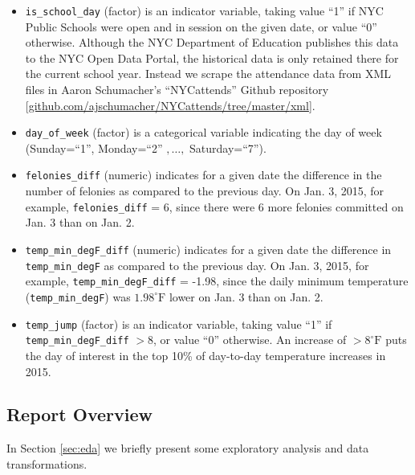 \documentclass[11pt,notitlepage]{article}
\newcommand{\degf}{^\circ\text{F}}
\begin{document}
\begin{itemize}
\item \texttt{is_school_day} (factor) is an indicator variable, taking value ``1'' if NYC Public Schools were open and in session on the given date, or value ``0'' otherwise. Although the NYC Department of Education publishes this data to the NYC Open Data Portal, the historical data is only retained there for the current school year. Instead we scrape the attendance data from XML files in Aaron Schumacher's ``NYCattends'' Github repository [\href{https://github.com/ajschumacher/NYCattends/tree/master/xml}{github.com/ajschumacher/NYCattends/tree/master/xml}].


\item \texttt{day_of_week} (factor) is a categorical variable indicating the day of week (Sunday=``1'', Monday=``2'' $, \ldots, $ Saturday=``7''). 

\item \texttt{felonies_diff} (numeric) indicates for a given date the difference in the number of felonies as compared to the previous day. On Jan. 3, 2015, for example, \texttt{felonies_diff} = 6, since there were 6 more felonies committed on Jan. 3 than on Jan. 2.

\item \texttt{temp_min_degF_diff} (numeric) indicates for a given date the difference in \texttt{temp_min_degF} as compared to the previous day. On Jan. 3, 2015, for example, \texttt{temp_min_degF_diff} = -1.98, since the daily minimum temperature (\texttt{temp_min_degF}) was $1.98 \degf$ lower on Jan. 3 than on Jan. 2.

\item \texttt{temp_jump} (factor) is an indicator variable, taking value ``1'' if \texttt{temp_min_degF_diff} $> 8$, or value ``0'' otherwise. An increase of $> 8 \degf$ puts the day of interest in the top 10\% of day-to-day temperature increases in 2015.

\end{itemize}



\subsection{Report Overview}

In Section \ref{sec:eda} we briefly present some exploratory analysis and data transformations.
\end{document}
